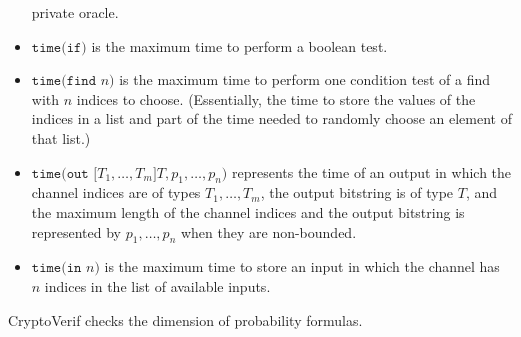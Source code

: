 \begin{itemize}
private oracle.
\fi
\item
$\texttt{time(if)}$ is the maximum time to perform a boolean test.
\item
$\texttt{time(find }n\texttt{)}$ is the maximum time to perform 
one condition test of a find with $n$ indices to choose.
(Essentially, the time to store the values of the indices in a 
list and part of the time needed to randomly choose an element
of that list.)
\ifchannels
\item
$\texttt{time(out [}T_1, \ldots, T_m\texttt{]}T, p_1, \ldots, p_n\texttt{)}$
represents the time of an output in which the channel indices are
of types $T_1, \ldots, T_m$, the output bitstring is of type $T$,
and the maximum length of the channel indices and the output bitstring
is represented by $p_1, \ldots, p_n$ when they are non-bounded.
\item
$\texttt{time(in }n\texttt{)}$ is the maximum time to store an
input in which the channel has $n$ indices in the list of
available inputs.
\fi
\end{itemize}
CryptoVerif checks the dimension of probability formulas.

